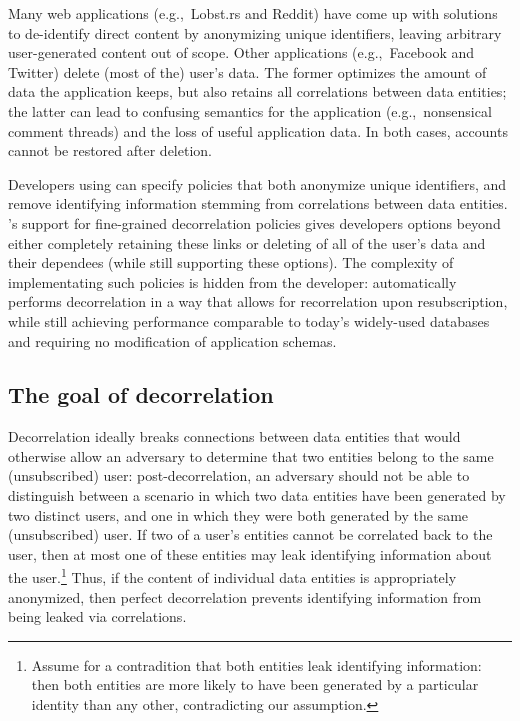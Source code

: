 Many web applications (e.g.,\ Lobst.rs and Reddit) have come up with solutions to de-identify direct
content by anonymizing unique identifiers, leaving arbitrary user-generated content out of scope.
Other applications (e.g.,\ Facebook and Twitter) delete (most of the) user's data. The former
optimizes the amount of data the application keeps, but also retains all correlations between data
entities; the latter can lead to confusing semantics for the application (e.g.,\ nonsensical comment
threads) and the loss of useful application data. In both cases, accounts cannot be restored after
deletion.

Developers using \sys{} can specify policies that both anonymize unique identifiers, and remove
identifying information stemming from correlations between data entities. \sys{}'s support for
fine-grained decorrelation policies gives developers options beyond either completely retaining
these links or deleting of all of the user's data and their dependees (while still supporting
these options). The complexity of implementating such policies is hidden from the developer:
\sys{} automatically performs decorrelation in a way that allows for recorrelation upon
resubscription, while still achieving performance comparable to today’s widely-used databases and
requiring no modification of application schemas.

\subsection{The goal of decorrelation}
Decorrelation ideally breaks connections between data entities that would otherwise allow
an adversary to determine that two entities belong to the same (unsubscribed) user:
post-decorrelation, an adversary should not be able to distinguish between a scenario in which two data entities
have been generated by two distinct users, and one in which they were both generated by the same
(unsubscribed) user.  If two of a user's entities cannot be correlated back to the user, then at
most one of these entities may leak identifying information about the user.\footnote{Assume for a
contradition that both entities leak identifying information: then both entities are more likely to
have been generated by a particular identity than any other, contradicting our assumption.}  Thus,
if the content of individual data entities is appropriately anonymized, then perfect decorrelation prevents
identifying information from being leaked via correlations.

